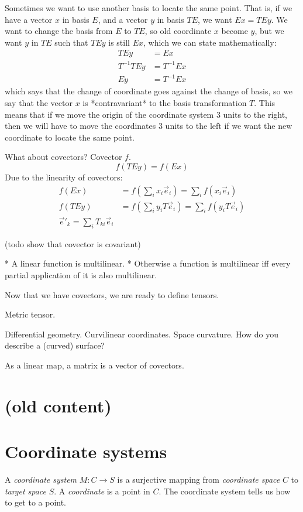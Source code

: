 Sometimes we want to use another basis to locate the same point.
That is, if we have a vector $x$ in basis $E$, and a vector $y$ in basis $TE$,
we want $Ex = TEy$.
We want to change the basis from $E$ to $TE$,
so old coordinate $x$ become $y$,
but we want $y$ in $TE$ such that $TEy$ is still $Ex$,
which we can state mathematically:
\begin{align*}
TEy &= Ex
\\ T^{-1}TEy &= T^{-1}Ex
\\ Ey &= T^{-1}Ex
\end{align*}
which says that the change of coordinate goes against the change of basis,
so we say that the vector $x$ is *contravariant* to the basis transformation $T$.
This means that if we move the origin of the coordinate system 3 units to the right,
then we will have to move the coordinates 3 units to the left
if we want the new coordinate to locate the same point.

What about covectors?
Covector $f$.
\[
f(TEy) = f(Ex)
\]
Due to the linearity of covectors:
\begin{align*}
f(Ex) &= f\left(\sum_i x_i \vec{e}_i\right) = \sum_i f(x_i \vec{e}_i)
\\ f(TEy) &= f\left(\sum_i y_i T\vec{e}_i \right) = \sum_i f(y_i T\vec{e}_i)
\\ \vec{e}'_k = \sum_i T_{ki} \vec{e}_i
\end{align*}

(todo show that covector is covariant)

* A linear function is multilinear.
* Otherwise a function is multilinear iff every partial application of it is also multilinear.

Now that we have covectors, we are ready to define tensors.

Metric tensor.

Differential geometry. Curvilinear coordinates. Space curvature.
How do you describe a (curved) surface?

As a linear map, a matrix is a vector of covectors.

\section{(old content)}

\section{Coordinate systems}

A \emph{coordinate system} $M : C \to S$ is a surjective mapping from
\emph{coordinate space} $C$ to \emph{target space} $S$.
A \emph{coordinate} is a point in \(C\).
The coordinate system tells us how to get to a point.

